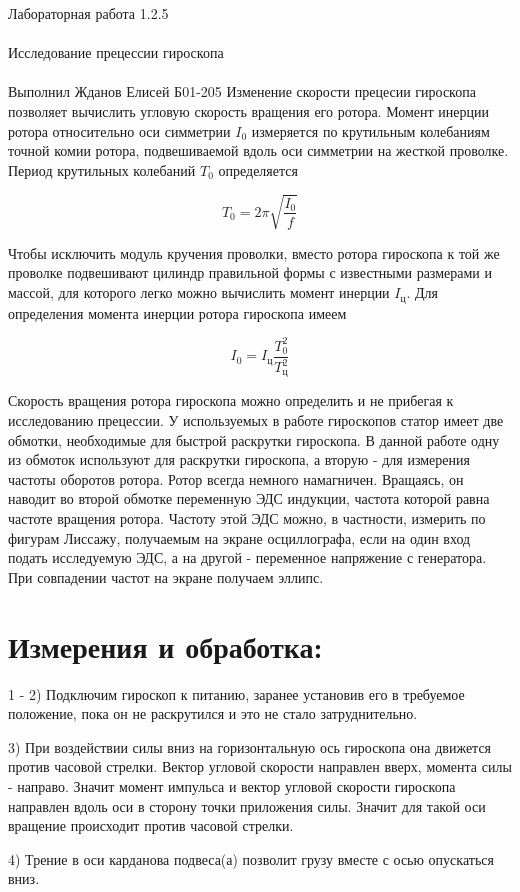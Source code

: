 \documentclass{astroedu-lab}
\begin{document}
\begin{problem}{\huge Лабораторная работа 1.2.5\\\\Исследование прецессии гироскопа\\\\Выполнил Жданов Елисей Б01-205}
Изменение скорости прецесии гироскопа позволяет вычислить угловую скорость вращения его ротора. Момент инерции ротора относительно оси симметрии $I_0$ измеряется по крутильным колебаниям точной комии ротора, подвешиваемой вдоль оси симметрии на жесткой проволке. Период крутильных колебаний $T_0$ определяется

\begin{equation}
	T_0 = 2 \pi \sqrt{\frac{I_0}{f}}
\end{equation}

Чтобы исключить модуль кручения проволки, вместо ротора гироскопа к той же проволке подвешивают цилиндр правильной формы с известными размерами и массой, для которого легко можно вычислить момент инерции $I_{\text{ц}}$. Для определения момента инерции ротора гироскопа имеем

\begin{equation}
	I_0 = I_\text{ц}\frac{T_0^2}{T_\text{ц}^2}
\end{equation}

Скорость вращения ротора гироскопа можно определить и не прибегая к исследованию прецессии. У используемых в работе гироскопов статор имеет две обмотки, необходимые для быстрой раскрутки гироскопа. В данной работе одну из обмоток используют для раскрутки гироскопа, а вторую - для измерения частоты оборотов ротора. Ротор всегда немного намагничен. Вращаясь, он наводит во второй обмотке переменную ЭДС индукции, частота которой равна частоте вращения ротора. Частоту этой ЭДС можно, в частности, измерить по фигурам Лиссажу, получаемым на экране осциллографа, если на один вход подать исследуемую ЭДС, а на другой - переменное напряжение с генератора. При совпадении частот на экране получаем эллипс.

\section{Измерения и обработка:}

1 - 2) Подключим гироскоп к питанию, заранее установив его в требуемое положение, пока он не раскрутился и это не стало затруднительно.

3) При воздействии силы вниз на горизонтальную ось гироскопа она движется против часовой стрелки. Вектор угловой скорости направлен вверх, момента силы - направо. Значит момент импульса и вектор угловой скорости гироскопа направлен вдоль оси в сторону точки приложения силы. Значит для такой оси вращение происходит против часовой стрелки.

4) Трение в оси карданова подвеса(а) позволит грузу вместе с осью опускаться вниз.


\end{problem}
\end{document}
